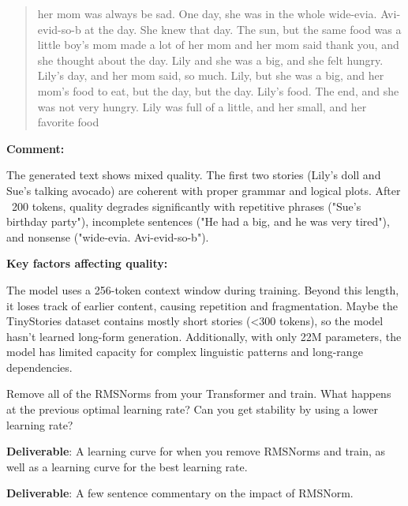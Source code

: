 \begin{answer}
\begin{quote}
her mom was always be sad. One day, she was in the whole wide-evia. Avi-evid-so-b at the day. She knew that day. The sun, but the same food was a little boy's mom made a lot of her mom and her mom said thank you, and she thought about the day. Lily and she was a big, and she felt hungry. Lily's day, and her mom said, so much. Lily, but she was a big, and her mom's food to eat, but the day, but the day. Lily's food. The end, and she was not very hungry. Lily was full of a little, and her small, and her favorite food
\end{quote}

\textbf{Comment:}

The generated text shows mixed quality. The first two stories (Lily's doll and Sue's talking avocado) are coherent with proper grammar and logical plots. After ~200 tokens, quality degrades significantly with repetitive phrases ("Sue's birthday party"), incomplete sentences ("He had a big, and he was very tired"), and nonsense ("wide-evia. Avi-evid-so-b").

\textbf{Key factors affecting quality:}

The model uses a 256-token context window during training. Beyond this length, it loses track of earlier content, causing repetition and fragmentation. Maybe the TinyStories dataset contains mostly short stories (<300 tokens), so the model hasn't learned long-form generation. Additionally, with only 22M parameters, the model has limited capacity for complex linguistic patterns and long-range dependencies.

\end{answer}


Remove all of the RMSNorms from your Transformer and train. What happens at the previous optimal learning rate? Can you get stability by using a lower learning rate?

\textbf{Deliverable}: A learning curve for when you remove RMSNorms and train, as well as a learning curve for the best learning rate.

\textbf{Deliverable}: A few sentence commentary on the impact of RMSNorm.

